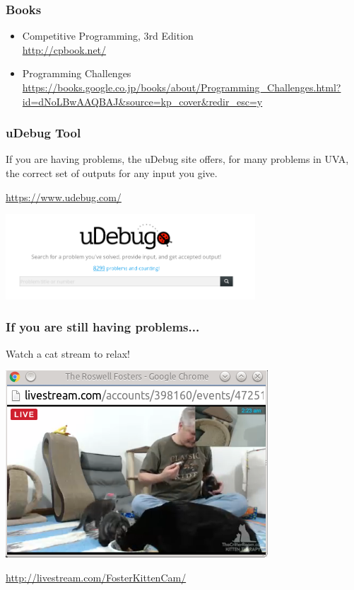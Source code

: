 \documentclass{beamer}
\begin{document}
\begin{frame}
  \frametitle{Books}

  \begin{itemize}
  \item {} Competitive Programming, 3rd Edition\\
    \url{http://cpbook.net/}\\
    
    \bigskip

  \item {} Programming Challenges\\
    \url{https://books.google.co.jp/books/about/Programming_Challenges.html?id=dNoLBwAAQBAJ&source=kp_cover&redir_esc=y}
  \end{itemize}
\end{frame}

\begin{frame}
  \frametitle{uDebug Tool}

  If you are having problems, the uDebug site offers, for many
  problems in UVA, the correct set of outputs for any input you give.

  \bigskip

  \url{https://www.udebug.com/}

  \bigskip

  \begin{center}
    \includegraphics[width=0.7\textwidth]{../img/udebug}
  \end{center}
\end{frame}

\begin{frame}
  \frametitle{If you are still having problems...}

  Watch a cat stream to relax!

  \bigskip

  \begin{center}
    \includegraphics[width=.6\textwidth]{../img/catstream}
  \end{center}

  \bigskip

  \url{http://livestream.com/FosterKittenCam/}
\end{frame}
\end{document}
